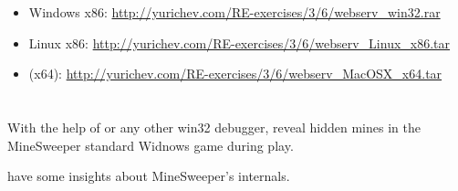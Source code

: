 \begin{itemize}
\item Windows x86: \url{http://yurichev.com/RE-exercises/3/6/webserv_win32.rar}
\item Linux x86: \url{http://yurichev.com/RE-exercises/3/6/webserv_Linux_x86.tar}
\item \MacOSX (x64): \url{http://yurichev.com/RE-exercises/3/6/webserv_MacOSX_x64.tar}
\end{itemize}

\section{}

{With the help of \tracer or any other win32 debugger, reveal hidden mines in the MineSweeper standard Widnows game
during play}.

 \cite{trew} 
{have some insights about MineSweeper's internals}.
